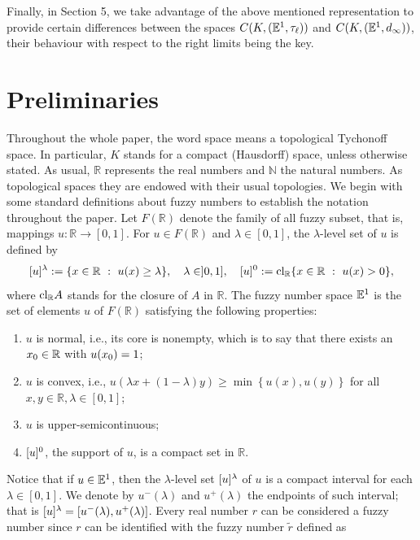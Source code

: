 \documentclass{amsart}
\newcommand{\R}{{\mathbb{R}}}
\newcommand{\N}{{\mathbb{N}}}
\newcommand{\fn}{\mathbb{E}\sp{1}}
\begin{document}
Finally, in Section 5, we take advantage of the above mentioned representation to provide certain differences between the spaces  $C(K,(\fn,\tau_{\ell}))$ and $C(K,(\fn,d_{\infty}))$, their behaviour with respect to the right limits being the key.




\section{Preliminaries}

Throughout the whole paper, the word space means a topological Tychonoff space. In particular,  $K$ stands for a compact (Hausdorff) space, unless otherwise stated.
As usual, $\R$ represents the real numbers and $\N$ the natural numbers. As topological spaces they are endowed with their usual topologies.
We begin with some standard definitions about fuzzy numbers to establish the notation throughout the paper.
Let $F(\R)$ denote the family of all fuzzy subset,  that is, mappings $u:\R\rightarrow [0,1]$. For $u\in F(\R)$ and $\lambda\in [0,1]$, the $\lambda$-level set
of $u$ is defined by
$$
[u]\sp{\lambda}:=\{x\in\R \ :\ u(x)\geq \lambda\}, \quad
\lambda\in ]0,1] ,\quad [u]\sp{0}:={\rm cl}\sb{\R}\{x\in\R\ :\ u(x)>0\},
$$
where ${\rm cl}\sb{\R}A$ stands for the closure of $A$ in $\R$. The fuzzy number space $\fn$ is the set of elements $u$ of
$F(\R)$ satisfying the following properties:

\begin{enumerate}[(1)]
 \item $u$ is normal, i.e., its core is nonempty, which is to say that there exists an $x\sb{0}\in\R$ with $u(x\sb{0})=1$;
\item $u$ is convex, i.e., $u(\lambda x + (1-\lambda)y)\geq \min
\left\{u(x),u(y)\right\}$  for all $x,y\in \R, \lambda\in [0,1]$;
\item $u$ is upper-semicontinuous;
\item $[u]\sp{0}$, the support of $u$, is a compact set in $\R$.
\end{enumerate}

Notice that if $u\in\fn$, then the $\lambda$-level set
$[u]\sp{\lambda}$ of $u$ is a compact interval for each
$\lambda\in [0,1]$. We denote by $u^-(\lambda)$ and $u^+(\lambda)$ the endpoints of such interval; that is $[u]\sp{\lambda}=[u^-(\lambda),u^+(\lambda)]$.  Every real
number $r$ can be considered a fuzzy number since  $r$ can be
identified with the fuzzy number $\tilde{r}$ defined as
\end{document}
